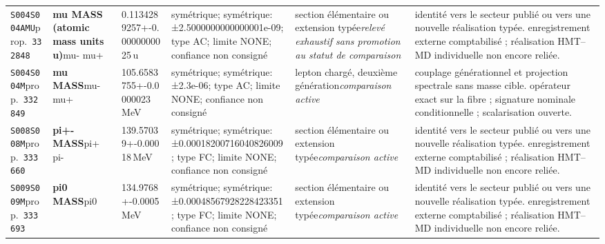 \begin{landscape}
\begin{longtable}{L{1.85cm}L{4.45cm}L{2.35cm}L{4.05cm}L{3.35cm}L{7.15cm}}
\texttt{S004}\newline \texttt{S004AMU}\newline prop.\ \texttt{332848} & \textbf{mu MASS (atomic mass units u)}\newline mu- \textbar{}\allowbreak{} mu+ & 0.1134289257+-0.0000000025\,u & symétrique; symétrique: ±2.5000000000000001e-09; type AC; limite NONE; confiance non consigné & section élémentaire ou extension typée\newline \emph{relevé exhaustif sans promotion au statut de comparaison} & identité vers le secteur publié ou vers une nouvelle réalisation typée. enregistrement externe comptabilisé ; réalisation HMT--MD individuelle non encore reliée. \\
\texttt{S004}\newline \texttt{S004M}\newline prop.\ \texttt{332849} & \textbf{mu MASS}\newline mu- \textbar{}\allowbreak{} mu+ & 105.6583755+-0.0000023\,MeV & symétrique; symétrique: ±2.3e-06; type AC; limite NONE; confiance non consigné & lepton chargé, deuxième génération\newline \emph{comparaison active} & couplage générationnel et projection spectrale sans masse cible. opérateur exact sur la fibre ; signature nominale conditionnelle ; scalarisation ouverte. \\
\texttt{S008}\newline \texttt{S008M}\newline prop.\ \texttt{333660} & \textbf{pi+- MASS}\newline pi+ \textbar{}\allowbreak{} pi- & 139.57039+-0.00018\,MeV & symétrique; symétrique: ±0.00018200716040826009; type FC; limite NONE; confiance non consigné & section élémentaire ou extension typée\newline \emph{comparaison active} & identité vers le secteur publié ou vers une nouvelle réalisation typée. enregistrement externe comptabilisé ; réalisation HMT--MD individuelle non encore reliée. \\
\texttt{S009}\newline \texttt{S009M}\newline prop.\ \texttt{333693} & \textbf{pi0 MASS}\newline pi0 & 134.9768+-0.0005\,MeV & symétrique; symétrique: ±0.00048567928228423351; type FC; limite NONE; confiance non consigné & section élémentaire ou extension typée\newline \emph{comparaison active} & identité vers le secteur publié ou vers une nouvelle réalisation typée. enregistrement externe comptabilisé ; réalisation HMT--MD individuelle non encore reliée. \\

\end{longtable}
\end{landscape}
